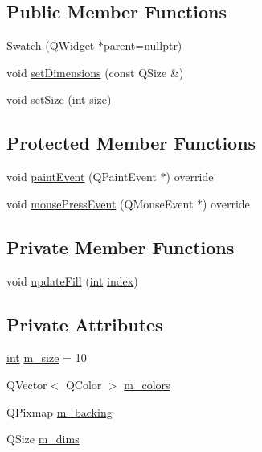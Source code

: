 \subsection*{Public Member Functions}
\begin{DoxyCompactItemize}
\item 
\mbox{\hyperlink{class_q_g_b_a_1_1_swatch_a5a1acd1c3793314d96e4209bfe89960b}{Swatch}} (Q\+Widget $\ast$parent=nullptr)
\item 
void \mbox{\hyperlink{class_q_g_b_a_1_1_swatch_a13601b6763efa2a1858e1acb7d6289ad}{set\+Dimensions}} (const Q\+Size \&)
\item 
void \mbox{\hyperlink{class_q_g_b_a_1_1_swatch_a2de15472f12d992a5462e188497453b2}{set\+Size}} (\mbox{\hyperlink{ioapi_8h_a787fa3cf048117ba7123753c1e74fcd6}{int}} \mbox{\hyperlink{ioapi_8h_a014d89bd76f74ef3a29c8f04b473eb76}{size}})
\end{DoxyCompactItemize}
\subsection*{Protected Member Functions}
\begin{DoxyCompactItemize}
\item 
void \mbox{\hyperlink{class_q_g_b_a_1_1_swatch_a2f975173d122980c736355fde29007b3}{paint\+Event}} (Q\+Paint\+Event $\ast$) override
\item 
void \mbox{\hyperlink{class_q_g_b_a_1_1_swatch_a0014bb2dc20fc5dceaa64566db83335f}{mouse\+Press\+Event}} (Q\+Mouse\+Event $\ast$) override
\end{DoxyCompactItemize}
\subsection*{Private Member Functions}
\begin{DoxyCompactItemize}
\item 
void \mbox{\hyperlink{class_q_g_b_a_1_1_swatch_abaae45bdb263ea64d78e525f3cbb72e5}{update\+Fill}} (\mbox{\hyperlink{ioapi_8h_a787fa3cf048117ba7123753c1e74fcd6}{int}} \mbox{\hyperlink{isa-lr35902_8c_ac9ee548085af12859cb52a6c757cf73a}{index}})
\end{DoxyCompactItemize}
\subsection*{Private Attributes}
\begin{DoxyCompactItemize}
\item 
\mbox{\hyperlink{ioapi_8h_a787fa3cf048117ba7123753c1e74fcd6}{int}} \mbox{\hyperlink{class_q_g_b_a_1_1_swatch_a8bbe23472b224588b23eb2fe73088d1a}{m\+\_\+size}} = 10
\item 
Q\+Vector$<$ Q\+Color $>$ \mbox{\hyperlink{class_q_g_b_a_1_1_swatch_af3cef0b15b59f5ddee2823c04b0594d4}{m\+\_\+colors}}
\item 
Q\+Pixmap \mbox{\hyperlink{class_q_g_b_a_1_1_swatch_a0d08c722a909f32f9808d8cd4f330fe3}{m\+\_\+backing}}
\item 
Q\+Size \mbox{\hyperlink{class_q_g_b_a_1_1_swatch_a87671333947997b45ec75231e1c1c3cb}{m\+\_\+dims}}
\end{DoxyCompactItemize}


